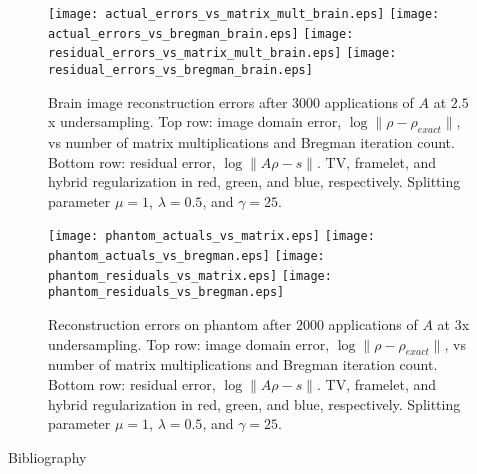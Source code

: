 \documentclass[xcolor=dvipsnames]{beamer}
\theoremstyle{remark}
\begin{document}
\begin{frame}
\begin{center}
\begin{figure}[h!]
\texttt{[image: actual\_errors\_vs\_matrix\_mult\_brain.eps]}
\texttt{[image: actual\_errors\_vs\_bregman\_brain.eps]}
\linebreak
\texttt{[image: residual\_errors\_vs\_matrix\_mult\_brain.eps]}
\texttt{[image: residual\_errors\_vs\_bregman\_brain.eps]}
\caption{Brain image reconstruction errors after $3000$ applications of $A$ at $2.5$x undersampling. Top row: image domain error, $\log \| \rho - \rho_{exact}\|$, vs number of matrix multiplications and Bregman iteration count. Bottom row: residual error, $\log \| A\rho - s \|$. TV, framelet, and hybrid regularization in red, green, and blue, respectively. Splitting parameter $\mu=1$, $\lambda=0.5$, and $\gamma=25$.}
\end{figure}
\end{center}
\end{frame}

\begin{frame}
\begin{center}
\begin{figure}[h!]
\texttt{[image: phantom\_actuals\_vs\_matrix.eps]}
\texttt{[image: phantom\_actuals\_vs\_bregman.eps]}
\linebreak
\texttt{[image: phantom\_residuals\_vs\_matrix.eps]}
\texttt{[image: phantom\_residuals\_vs\_bregman.eps]}
\caption{Reconstruction errors on phantom after $2000$ applications of $A$ at $3$x undersampling. Top row: image domain error, $\log \| \rho - \rho_{exact}\|$, vs number of matrix multiplications and Bregman iteration count. Bottom row: residual error, $\log \| A\rho - s \|$. TV, framelet, and hybrid regularization in red, green, and blue, respectively. Splitting parameter $\mu=1$, $\lambda=0.5$, and $\gamma=25$.}
\end{figure}
\end{center}
\end{frame}





\begin{frame}[allowframebreaks]{Bibliography}

%



\end{frame}
\end{document}
